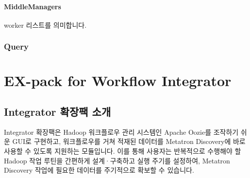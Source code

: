 \documentclass[letterpaper,10pt,english]{sphinxmanual}
\begin{document}
\subsection{MiddleManagers}
\label{\detokenize{discovery/part10/ingestion:middlemanagers}}
worker 리스트를 의미합니다.
\begin{quote}

\begin{figure}[H]
\centering

\noindent{}
\end{figure}

\begin{figure}[H]
\centering

\noindent{}
\end{figure}
\end{quote}


\section{Query}
\label{\detokenize{discovery/part10/query:query}}\label{\detokenize{discovery/part10/query::doc}}\begin{quote}

\begin{figure}[H]
\centering

\noindent{}
\end{figure}

\begin{figure}[H]
\centering

\noindent{}
\end{figure}
\end{quote}


\part{EX-pack for Workflow Integrator}
\label{\detokenize{index:ex-pack-for-workflow-integrator}}

\chapter{Integrator 확장팩 소개}
\label{\detokenize{integrator/part01/index:integrator}}\label{\detokenize{integrator/part01/index::doc}}
Integrator 확장팩은 Hadoop 워크플로우 관리 시스템인 Apache Oozie를 조작하기 쉬운 GUI로 구현하고, 워크플로우를 거쳐 적재된 데이터를 Metatron Discovery에 바로 사용할 수 있도록 지원하는 모듈입니다. 이를 통해 사용자는 반복적으로 수행해야 할 Hadoop 작업 루틴을 간편하게 설계·구축하고 실행 주기를 설정하여, Metatron Discovery 작업에 필요한 데이터를 주기적으로 확보할 수 있습니다.
\end{document}

